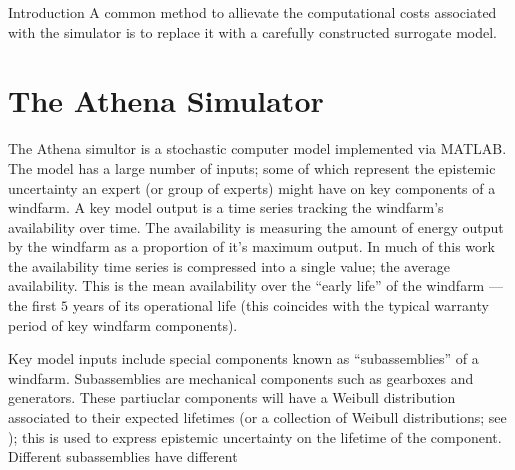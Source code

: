 \begin{chapter}{Introduction \label{Ch:Intro}}
A common method to allievate the computational costs associated with the simulator is to replace it with a carefully constructed surrogate model.

\section{The Athena Simulator}

The Athena simultor is a stochastic computer model implemented via MATLAB. The model has a large number of inputs; some of which represent the epistemic uncertainty an expert (or group of experts) might have on key components of a windfarm. A key model output is a time series tracking the windfarm's availability over time. The availability is measuring the amount of energy output by the windfarm as a proportion of it's maximum output. In much of this work the availability time series is compressed into a single value; the average availability. This is the mean availability over the ``early life'' of the windfarm --- the first $5$ years of its operational life (this coincides with the typical warranty period of key windfarm components).

Key model inputs include special components known as ``subassemblies'' of a windfarm. Subassemblies are mechanical components such as gearboxes and generators. These partiuclar components will have a Weibull distribution associated to their expected lifetimes (or a collection of Weibull distributions; see ); this is used to express epistemic uncertainty on the lifetime of the component. Different subassemblies have different 
\end{chapter}
